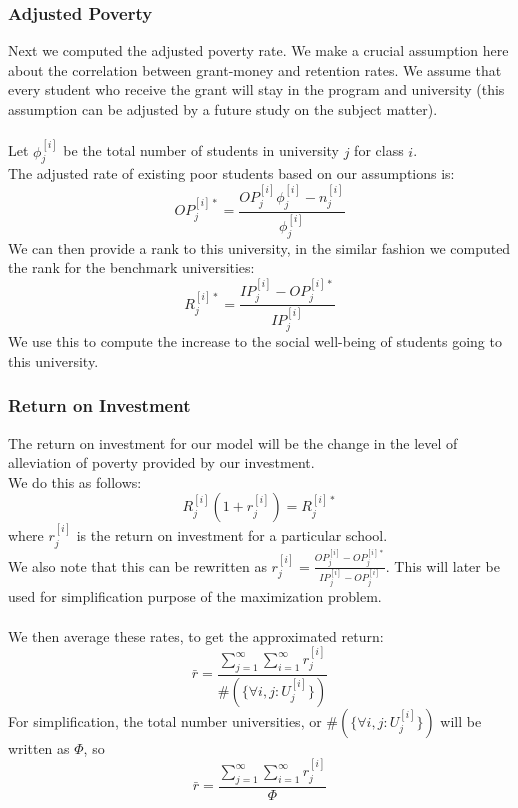 \documentclass[12pt]{article}
\begin{document}
	\subsubsection{Adjusted Poverty}
		Next we computed the adjusted poverty rate. We make a crucial assumption here about the correlation between grant-money and retention rates. We assume that every student who receive the grant will stay in the program and university (this assumption can be adjusted by a future study on the subject matter).\\
		\\
		Let $\phi_j^{[i]}$ be the total number of students in university $j$ for class $i$.\\
		The adjusted rate of existing poor students based on our assumptions is:
		$$
			OP_j^{[i]*} = \frac{  OP_j^{[i]}\phi_j^{[i]}-n_j^{[i]}  }{ \phi_j^{[i]}  }
		$$
		We can then provide a rank to this university, in the similar fashion we computed the rank for the benchmark universities:
		$$
			R_j^{[i]*}=\frac{IP_j^{[i]}-OP_j^{[i]*}}{IP_j^{[i]}}
		$$
		We use this to compute the increase to the social well-being of students going to this university. 

	\subsubsection{Return on Investment}
		The return on investment for our model will be the change in the level of alleviation of poverty provided by our investment.\\
		We do this as follows:
		$$
			R_j^{[i]}(1+r_j^{[i]}) = R_j^{[i]*}
		$$
		where $r_j^{[i]}$ is the return on investment for a particular school.\\
		We also note that this can be rewritten as $r_j^{[i]} = \frac{ OP_j^{[i]} - OP_j^{[i]*}  }{ IP_j^{[i]} - OP_j^{[i]}  }$. This will later be used for simplification purpose of the maximization problem.\\
		\\
		We then average these rates, to get the approximated return:
		$$
			\bar{r} = \frac{ \sum_{j=1}^\infty\sum_{i=1}^\infty r_j^{[i]}  }{ \# (\{ \forall i, j :  U_j^{[i]} \}) }
		$$
		For simplification, the total number universities, or $\# (\{ \forall i, j :  U_j^{[i]} \})$ will be written as $\Phi$, so
		$$
			\bar{r} = \frac{ \sum_{j=1}^\infty\sum_{i=1}^\infty r_j^{[i]}  }{ \Phi }
		$$
\end{document}
